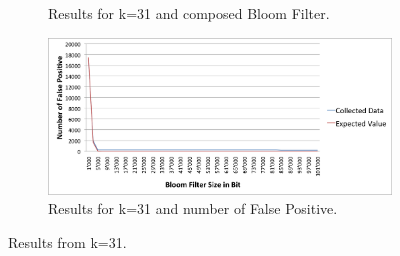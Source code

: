 \documentclass[12]{scrartcl}
\begin{document}
\begin{figure}[H]
\begin{subfigure}[t]{\textwidth}
\begin{center}
		\end{center}
		\caption{Results for k=31 and composed Bloom Filter.}
	\end{subfigure}
	\begin{subfigure}[t]{\textwidth}
		\begin{center}
			\includegraphics[scale=0.3]{res/31-fp.png}
		\end{center}
		\caption{Results for k=31 and number of False Positive.}
	\end{subfigure}
	\caption{Results from k=31.}
\end{figure}
\end{document}
